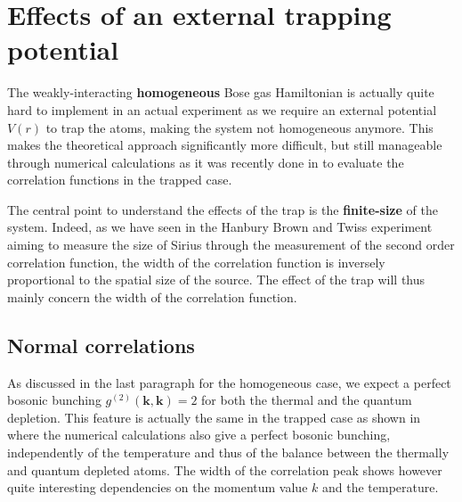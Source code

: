 \section{Effects of an external trapping potential}

\label{sec:width_correlation_theo}
  
The weakly-interacting \textbf{homogeneous} Bose gas Hamiltonian is actually quite hard to implement in an actual experiment as we require an external potential $V(r)$ to trap the atoms, making the system not homogeneous anymore. This makes the theoretical approach significantly more difficult, but still manageable through numerical calculations as it was recently done in \cite{butera2020} to evaluate the correlation functions in the trapped case.

The central point to understand the effects of the trap is the \textbf{finite-size} of the system. Indeed, as we have seen in the Hanbury Brown and Twiss experiment aiming to measure the size of Sirius through the measurement of the second order correlation function, the width of the correlation function is inversely proportional to the spatial size of the source. The effect of the trap will thus mainly concern the width of the correlation function.

\subsection{Normal correlations}

\label{sec:width_normal_theo}

As discussed in the last paragraph for the homogeneous case, we expect a perfect bosonic bunching $g^{(2)}(\bm{k},\bm{k})=2$ for both the thermal and the quantum depletion. This feature is actually the same in the trapped case as shown in \cite{butera2020} where the numerical calculations also give a perfect bosonic bunching, independently of the temperature and thus of the balance between the thermally and quantum depleted atoms. The width of the correlation peak shows however quite interesting dependencies on the momentum value $k$ and the temperature.

